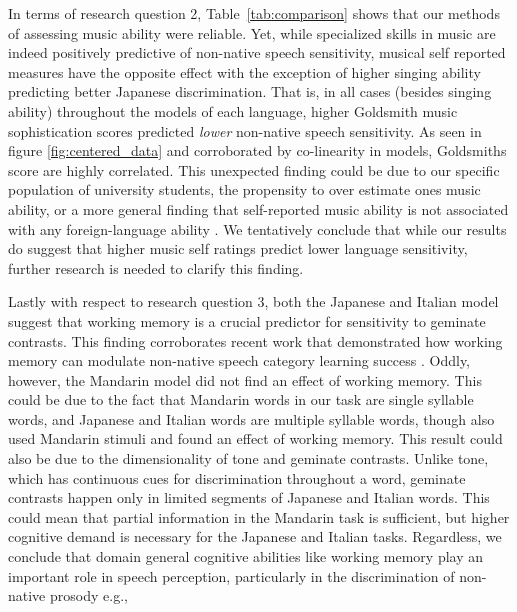\documentclass[a4paper]{article}
\begin{document}
In terms of research question 2, Table~\ref{tab:comparison} shows that our methods of assessing music ability were reliable. Yet, while specialized skills in music are indeed positively predictive of non-native speech sensitivity, musical self reported measures have the opposite effect with the exception of higher singing ability predicting better Japanese discrimination. That is, in all cases (besides singing ability) throughout the models of each language, higher Goldsmith music sophistication scores predicted \emph{lower} non-native speech sensitivity. As seen in figure \ref{fig:centered_data} and corroborated by co-linearity in models, Goldsmiths score are highly correlated. This unexpected finding could be due to our specific population of university students, the propensity to over estimate ones music ability, or a more general finding that self-reported music ability is not associated with any foreign-language ability \cite{larrouy_maestri_et_al_2023_selfevaluation,correia_et_al_2023_selfawareness,schellenberg_et_al_2023_musical}. We tentatively conclude that while our results do suggest that higher music self ratings predict lower language sensitivity, further research is needed to clarify this finding. 

Lastly with respect to research question 3, both the Japanese and Italian model suggest that working memory is a crucial predictor for sensitivity to geminate contrasts. This finding corroborates recent work that demonstrated how working memory can modulate non-native speech category learning success \cite{mchaney_et_al_2021_workingmemory}. Oddly, however, the Mandarin model did not find an effect of working memory. This could be due to the fact that Mandarin words in our task are single syllable words, and Japanese and Italian words are multiple syllable words, though \cite{mchaney_et_al_2021_workingmemory} also used Mandarin stimuli and found an effect of working memory. This result could also be due to the dimensionality of tone and geminate contrasts. Unlike tone, which has continuous cues for discrimination throughout a word, geminate contrasts happen only in limited segments of Japanese and Italian words. This could mean that partial information in the Mandarin task is sufficient, but higher cognitive demand is necessary for the Japanese and Italian tasks. Regardless, we conclude that domain general cognitive abilities like working memory play an important role in speech perception, particularly in the discrimination of non-native prosody e.g., \cite{Kachlicka_Saito_Tierney_2019}
\end{document}

